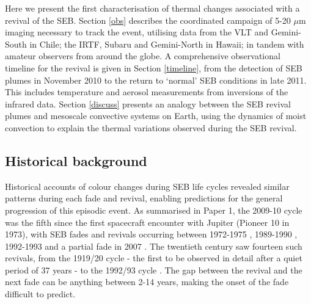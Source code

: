 \documentclass[final,authoryear,5p,times,twocolumn]{elsarticle}
\begin{document}
Here we present the first characterisation of thermal changes associated with a revival of the SEB.  Section \ref{obs} describes the coordinated campaign of 5-20 $\mu$m imaging necessary to track the event, utilising data from the VLT and Gemini-South in Chile; the IRTF, Subaru and Gemini-North in Hawaii; in tandem with amateur observers from around the globe.  A comprehensive observational timeline for the revival is given in Section \ref{timeline}, from the detection of SEB plumes in November 2010 to the return to `normal' SEB conditions in late 2011.  This includes temperature and aerosol measurements from inversions of the infrared data.  Section \ref{discuss} presents an analogy between the SEB revival plumes and mesoscale convective systems on Earth, using the dynamics of moist convection to explain the thermal variations observed during the SEB revival.

\subsection{Historical background}
Historical accounts of colour changes during SEB life cycles \citep{58peek, 95rogers, 96sanchez} revealed similar patterns during each fade and revival, enabling predictions for the general progression of this episodic event.  As summarised in Paper 1, the 2009-10 cycle was the fifth since the first spacecraft encounter with Jupiter (Pioneer 10 in 1973), with SEB fades and revivals occurring between 1972-1975 \citep{81orton, 95rogers}, 1989-1990 \citep{92rogers, 92satoh, 93kuehn, 94satoh}, 1992-1993 \citep{96sanchez, 97moreno} and a partial fade in 2007 \citep{07reuter, 07baines}.  The twentieth century saw fourteen such revivals, from the 1919/20 cycle - the first to be observed in detail after a quiet period of 37 years - to the 1992/93 cycle \citep{95rogers}.  The gap between the revival and the next fade can be anything between 2-14 years, making the onset of the fade difficult to predict.  
\end{document}
